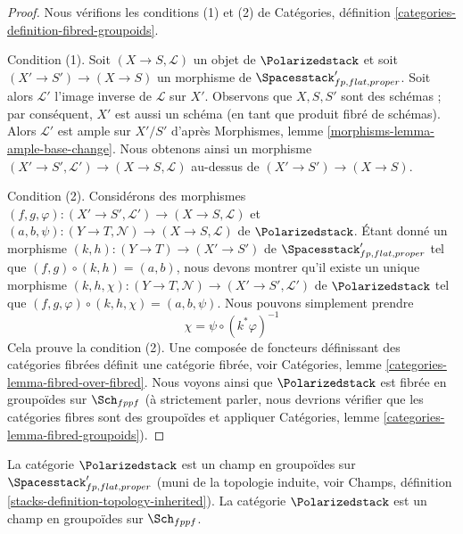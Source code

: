 \begin{proof}
Nous vérifions les conditions (1) et (2) de
Catégories, définition \ref{categories-definition-fibred-groupoids}.

\medskip\noindent
Condition (1). Soit $(X \to S, \mathcal{L})$ un objet de
$\Polarizedstack$ et soit $(X' \to S') \to (X \to S)$ un morphisme de
$\Spacesstack'_{fp, flat, proper}$. Soit alors $\mathcal{L}'$ l'image inverse
de $\mathcal{L}$ sur $X'$.
Observons que $X, S, S'$ sont des schémas ; par conséquent, $X'$ est aussi un
schéma (en tant que produit fibré de schémas). Alors $\mathcal{L}'$ est ample
sur $X'/S'$ d'après
Morphismes, lemme \ref{morphisms-lemma-ample-base-change}.
Nous obtenons ainsi un morphisme
$(X' \to S', \mathcal{L}') \to (X \to S, \mathcal{L})$
au-dessus de $(X' \to S') \to (X \to S)$.

\medskip\noindent
Condition (2). Considérons des morphismes
$(f, g, \varphi) : (X' \to S', \mathcal{L}') \to (X \to S, \mathcal{L})$ et
$(a, b, \psi) : (Y \to T, \mathcal{N}) \to (X \to S, \mathcal{L})$
de $\Polarizedstack$. Étant donné un morphisme
$(k, h) : (Y \to T) \to (X' \to S')$ de
$\Spacesstack'_{fp, flat, proper}$ tel que
$(f, g) \circ (k, h) = (a, b)$, nous devons montrer qu'il existe un unique
morphisme
$(k, h, \chi) : (Y \to T, \mathcal{N}) \to (X' \to S', \mathcal{L}')$
de $\Polarizedstack$ tel que
$(f, g, \varphi) \circ (k, h, \chi) = (a, b, \psi)$.
Nous pouvons simplement prendre
$$
\chi = \psi \circ (k^*\varphi)^{-1}
$$
Cela prouve la condition (2). Une composée de foncteurs définissant des
catégories fibrées définit une catégorie fibrée, voir
Catégories, lemme \ref{categories-lemma-fibred-over-fibred}.
Nous voyons ainsi que $\Polarizedstack$ est fibrée en groupoïdes sur
$\Sch_{fppf}$ (à strictement parler, nous devrions vérifier que les catégories
fibres sont des groupoïdes et appliquer
Catégories, lemme \ref{categories-lemma-fibred-groupoids}).
\end{proof}

\begin{lemma}
\label{lemma-polarized-stack}
La catégorie $\Polarizedstack$ est un champ en groupoïdes sur
$\Spacesstack'_{fp, flat, proper}$ (muni de la topologie induite, voir
Champs, définition \ref{stacks-definition-topology-inherited}).
La catégorie $\Polarizedstack$ est un champ en groupoïdes sur $\Sch_{fppf}$.
\end{lemma}

